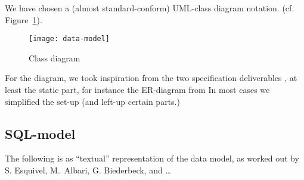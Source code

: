 





We have chosen a (almost standard-conform) UML-class diagram notation.
(cf. Figure~\ref{fig:classdiagram}).


\begin{figure}[htbp]
  \centering
  \texttt{[image: data-model]}
  \caption{Class diagram}
  \label{fig:classdiagram}
\end{figure}

For the diagram, we took inspiration from the two specification
deliverables \cite{coma:spec1} \cite{coma:spec2}, at least the static part,
for instance the ER-diagram from \cite{coma:spec1} In most cases we
simplified the set-up (and left-up certain parts.)





\subsection{SQL-model}
\label{sec:datamodel.sql}
%

The following is as ``textual'' representation of the data model, as worked
out by  S. Esquivel, M.\ Albari, G. Biederbeck, and \ldots









%


%

